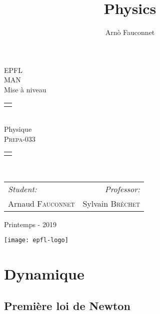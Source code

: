 \documentclass[
    11pt,
    a4paper,
    oneside,
    headinlcude, footinclude,
    twoside,
]{report}
\title{Physics}
\author{Arnò Fauconnet}
\begin{document}
\begin{titlepage}
   \begin{center}
       \vspace*{\fill}

       {\Huge EPFL}\\ 
       \vfill
       {\huge MAN}\\ [1em]
       {\Large Mise à niveau}\\
        \vfill
        \begin{tabularx}{\textwidth}{X}
            \Xhline{3\arrayrulewidth}\\
        \end{tabularx}\\ [2em]
        {\Huge Physique} \\ [1em]
        \textsc{\huge Prepa-033} \\ [2em]
        \begin{tabularx}{\textwidth}{X}
            \Xhline{3\arrayrulewidth}\\
        \end{tabularx}\\ [2em]
        \vspace{.7cm}
        {\large
        \begin{tabularx}{.9\textwidth}{Xr}
            \textit{Student:} & \textit{Professor:}\\
            Arnaud \textsc{Fauconnet} & Sylvain \textsc{Bréchet}
        \end{tabularx}}
        \vfill
        {\Large Printemps - 2019}

        \vfill
        \texttt{[image: epfl-logo]}

       \vfill
   \end{center} 
\end{titlepage} 
\setcounter{chapter}{2}
\chapter{Dynamique}
\label{cha:dynamique}

\section{Première loi de Newton}
\end{document}
